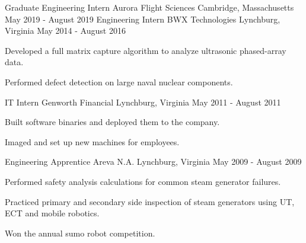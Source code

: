 

\begin{cventries}

  \scventry
    {Graduate Engineering Intern} %
    {Aurora Flight Sciences} %
    {Cambridge, Massachusetts} %
    {May 2019 - August 2019} %
  \cventry
    {Engineering Intern}
    {BWX Technologies}
    {Lynchburg, Virginia}
    {May 2014 - August 2016}
    {
      \begin{cvitems}
        \item Developed a full matrix capture algorithm to analyze ultrasonic phased-array data.
        \item Performed defect detection on large naval nuclear components.
      \end{cvitems}
    }
  \cventry
    {IT Intern}
    {Genworth Financial}
    {Lynchburg, Virginia}
    {May 2011 - August 2011}
    {
      \begin{cvitems}
        \item Built software binaries and deployed them to the company.
        \item Imaged and set up new machines for employees.
      \end{cvitems}
    }
  \cventry
    {Engineering Apprentice}
    {Areva N.A.}
    {Lynchburg, Virginia}
    {May 2009 - August 2009}
    {
      \begin{cvitems}
        \item Performed safety analysis calculations for common steam generator failures.
        \item Practiced primary and secondary side inspection of steam generators using UT, ECT and mobile robotics. 
        \item Won the annual sumo robot competition.
      \end{cvitems}
    }

\end{cventries}
